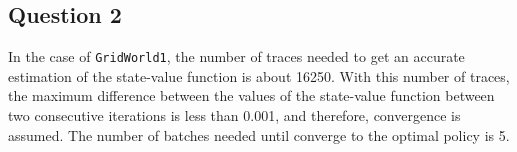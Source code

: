 \documentclass[11pt]{article}   	%
\begin{document}
\subsection*{Question 2}

In the case of \texttt{GridWorld1}, the number of traces needed to get an accurate estimation of the state-value function is about 16250. With this number of traces, the maximum difference between the values of the state-value function between two consecutive iterations is less than 0.001, and therefore, convergence is assumed. The number of batches needed until converge to the optimal policy is 5.
\end{document}
